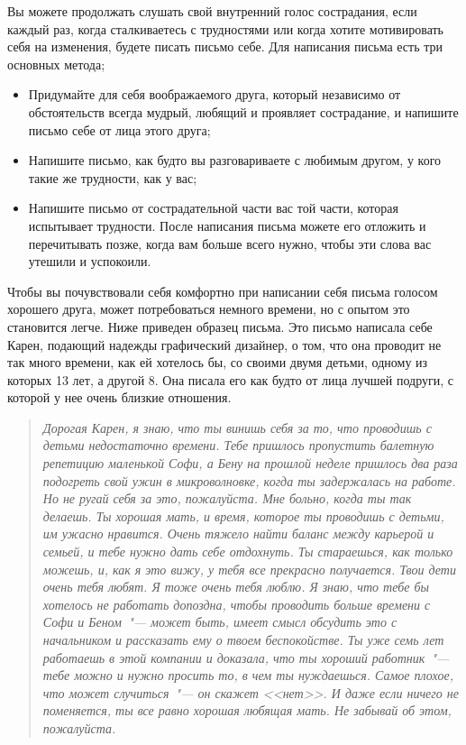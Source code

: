 Вы можете продолжать слушать свой внутренний голос сострадания, если каждый раз, когда сталкиваетесь с трудностями или когда хотите мотивировать себя на изменения, будете писать письмо себе. Для написания письма есть три основных метода;

\begin{itemize}
	\item Придумайте для себя воображаемого друга, который независимо от обстоятельств всегда мудрый, любящий и проявляет сострадание, и напишите письмо себе от лица этого друга;
	\item Напишите письмо, как будто вы разговариваете с любимым другом, у кого такие же трудности, как у вас;
	\item Напишите письмо от сострадательной части вас той части, которая испытывает трудности.
	После написания письма можете его отложить и перечитывать позже, когда вам больше всего нужно, чтобы эти слова вас утешили и успокоили. 
\end{itemize}

Чтобы вы почувствовали себя комфортно при написании себя письма голосом хорошего друга, может потребоваться немного времени, но с опытом это становится легче. Ниже приведен образец письма. Это письмо написала себе Карен, подающий надежды графический дизайнер, о том, что она проводит не так много времени, как ей хотелось бы, со своими двумя детьми, одному из которых 13 лет, а другой 8. Она писала его как будто от лица лучшей подруги, с которой у нее очень близкие отношения.

\begin{quotation}
	\textit{
		Дорогая Карен, я знаю, что ты винишь себя за то, что проводишь с детьми недостаточно времени. Тебе пришлось пропустить балетную репетицию маленькой Софи, а Бену на прошлой неделе пришлось два раза подогреть свой ужин в микроволновке, когда ты задержалась на работе. Но не ругай себя за это, пожалуйста. Мне больно, когда ты так делаешь. Ты хорошая мать, и время, которое ты проводишь с детьми, им ужасно нравится. Очень тяжело найти баланс между карьерой и семьей, и тебе нужно дать себе отдохнуть. Ты стараешься, как только можешь, и, как я это вижу, у тебя все прекрасно получается. Твои дети очень тебя любят. Я тоже очень тебя люблю. Я знаю, что тебе бы хотелось не работать допоздна, чтобы проводить больше времени с Софи и Беном~"--- может быть, имеет смысл обсудить это с начальником и рассказать ему о твоем беспокойстве. Ты уже семь лет работаешь в этой компании и доказала, что ты хороший работник~"--- тебе можно и нужно просить то, в чем ты нуждаешься. Самое плохое, что может случиться~"--- он скажет <<нет>>. И даже если ничего не поменяется, ты все равно хорошая любящая мать. Не забывай об этом, пожалуйста.
	}
\end{quotation}
